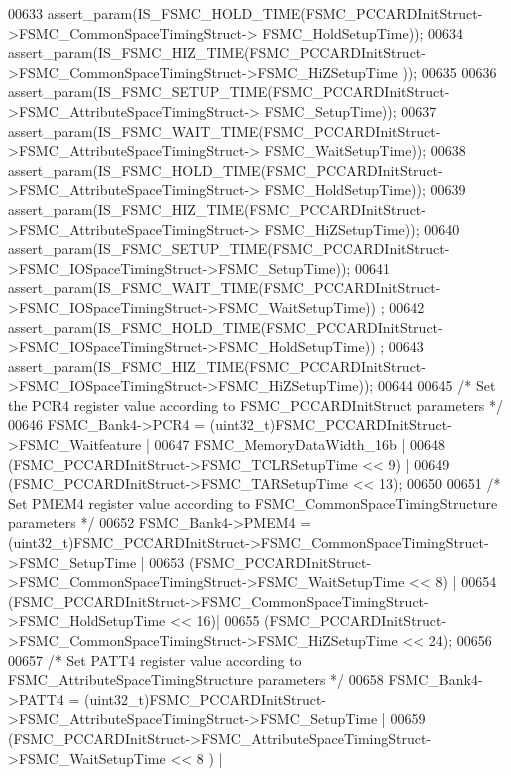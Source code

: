 \begin{DoxyCode}
00633   assert_param(IS\_FSMC\_HOLD\_TIME(FSMC\_PCCARDInitStruct->FSMC\_CommonSpaceTimingStruct->
      FSMC\_HoldSetupTime));
00634   assert_param(IS\_FSMC\_HIZ\_TIME(FSMC\_PCCARDInitStruct->FSMC\_CommonSpaceTimingStruct->FSMC\_HiZSetupTime
      ));
00635 
00636   assert_param(IS\_FSMC\_SETUP\_TIME(FSMC\_PCCARDInitStruct->FSMC\_AttributeSpaceTimingStruct->
      FSMC\_SetupTime));
00637   assert_param(IS\_FSMC\_WAIT\_TIME(FSMC\_PCCARDInitStruct->FSMC\_AttributeSpaceTimingStruct->
      FSMC\_WaitSetupTime));
00638   assert_param(IS\_FSMC\_HOLD\_TIME(FSMC\_PCCARDInitStruct->FSMC\_AttributeSpaceTimingStruct->
      FSMC\_HoldSetupTime));
00639   assert_param(IS\_FSMC\_HIZ\_TIME(FSMC\_PCCARDInitStruct->FSMC\_AttributeSpaceTimingStruct->
      FSMC\_HiZSetupTime));
00640   assert_param(IS\_FSMC\_SETUP\_TIME(FSMC\_PCCARDInitStruct->FSMC\_IOSpaceTimingStruct->FSMC\_SetupTime));
00641   assert_param(IS\_FSMC\_WAIT\_TIME(FSMC\_PCCARDInitStruct->FSMC\_IOSpaceTimingStruct->FSMC\_WaitSetupTime))
      ;
00642   assert_param(IS\_FSMC\_HOLD\_TIME(FSMC\_PCCARDInitStruct->FSMC\_IOSpaceTimingStruct->FSMC\_HoldSetupTime))
      ;
00643   assert_param(IS\_FSMC\_HIZ\_TIME(FSMC\_PCCARDInitStruct->FSMC\_IOSpaceTimingStruct->FSMC\_HiZSetupTime));
00644 
00645   \textcolor{comment}{/* Set the PCR4 register value according to FSMC\_PCCARDInitStruct parameters */}
00646   FSMC_Bank4->PCR4 = (uint32\_t)FSMC\_PCCARDInitStruct->FSMC\_Waitfeature |
00647                      FSMC_MemoryDataWidth_16b |
00648                      (FSMC\_PCCARDInitStruct->FSMC\_TCLRSetupTime << 9) |
00649                      (FSMC\_PCCARDInitStruct->FSMC\_TARSetupTime << 13);
00650 
00651   \textcolor{comment}{/* Set PMEM4 register value according to FSMC\_CommonSpaceTimingStructure parameters */}
00652   FSMC_Bank4->PMEM4 = (uint32\_t)FSMC\_PCCARDInitStruct->FSMC\_CommonSpaceTimingStruct->FSMC\_SetupTime |
00653                       (FSMC\_PCCARDInitStruct->FSMC\_CommonSpaceTimingStruct->FSMC\_WaitSetupTime << 8) |
00654                       (FSMC\_PCCARDInitStruct->FSMC\_CommonSpaceTimingStruct->FSMC\_HoldSetupTime << 16)|
00655                       (FSMC\_PCCARDInitStruct->FSMC\_CommonSpaceTimingStruct->FSMC\_HiZSetupTime << 24);
00656 
00657   \textcolor{comment}{/* Set PATT4 register value according to FSMC\_AttributeSpaceTimingStructure parameters */}
00658   FSMC_Bank4->PATT4 = (uint32\_t)FSMC\_PCCARDInitStruct->FSMC\_AttributeSpaceTimingStruct->FSMC\_SetupTime
       |
00659                       (FSMC\_PCCARDInitStruct->FSMC\_AttributeSpaceTimingStruct->FSMC\_WaitSetupTime << 8
      ) |

\end{DoxyCode}
